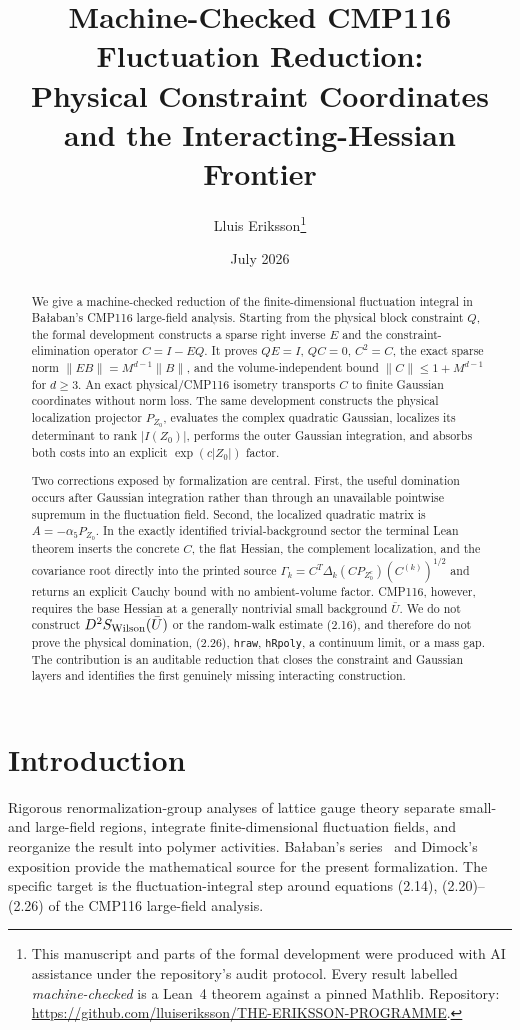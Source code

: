 \documentclass[11pt,a4paper]{article}
\title{Machine-Checked CMP116 Fluctuation Reduction:\\
Physical Constraint Coordinates and the Interacting-Hessian Frontier}
\author{Lluis Eriksson\thanks{This manuscript and parts of the formal
development were produced with AI assistance under the repository's audit
protocol. Every result labelled \emph{machine-checked} is a Lean~4 theorem
against a pinned Mathlib. Repository:
\url{https://github.com/lluiseriksson/THE-ERIKSSON-PROGRAMME}.}}
\date{July 2026}
\theoremstyle{definition}
\newcommand{\lean}[1]{\texttt{#1}}
\begin{document}
\maketitle

\begin{abstract}
We give a machine-checked reduction of the finite-dimensional fluctuation
integral in Ba\l aban's CMP116 large-field analysis.  Starting from the
physical block constraint $Q$, the formal development constructs a sparse
right inverse $E$ and the constraint-elimination operator
$C=I-EQ$.  It proves $QE=I$, $QC=0$, $C^2=C$, the exact sparse norm
$\lVert EB\rVert=M^{d-1}\lVert B\rVert$, and the volume-independent bound
$\lVert C\rVert\le 1+M^{d-1}$ for $d\ge3$.  An exact physical/CMP116
isometry transports $C$ to finite Gaussian coordinates without norm loss.
The same development constructs the physical localization projector
$P_{Z_0}$, evaluates the complex quadratic Gaussian, localizes its determinant
to rank $|I(Z_0)|$, performs the outer Gaussian integration, and absorbs both
costs into an explicit $\exp(c|Z_0|)$ factor.

Two corrections exposed by formalization are central.  First, the useful
domination occurs after Gaussian integration rather than through an
unavailable pointwise supremum in the fluctuation field.  Second, the
localized quadratic matrix is $A=-\alpha_5P_{Z_0}$.  In the exactly identified
trivial-background sector the terminal Lean theorem inserts the concrete
$C$, the flat Hessian, the complement localization, and the covariance root
directly into the printed source
$\Gamma_k=C^T\Delta_k(CP_{Z_0^c})(C^{(k)})^{1/2}$ and returns an explicit
Cauchy bound with no ambient-volume factor.  CMP116, however, requires the
base Hessian at a generally nontrivial small background $\bar U$.  We do not
construct $D^2S_{\rm Wilson}(\bar U)$ or the random-walk estimate (2.16), and
therefore do not prove the physical domination, (2.26), \lean{hraw},
\lean{hRpoly}, a continuum limit, or a mass gap.  The contribution is an
auditable reduction that closes the constraint and Gaussian layers and
identifies the first genuinely missing interacting construction.
\end{abstract}

\section{Introduction}

Rigorous renormalization-group analyses of lattice gauge theory separate
small- and large-field regions, integrate finite-dimensional fluctuation
fields, and reorganize the result into polymer activities.  Ba\l aban's
series~\cite{Bal87,Bal88a,Bal88b,Bal89} and Dimock's exposition
\cite{Dim13a,Dim13b,Dim14} provide the mathematical source for the present
formalization.  The specific target is the fluctuation-integral step around
equations (2.14), (2.20)--(2.26) of the CMP116 large-field analysis.
\end{document}
